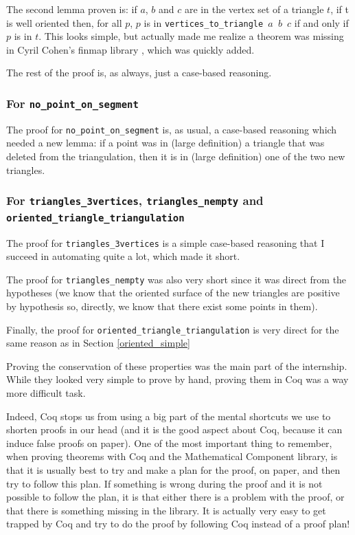 \documentclass[a4paper,10pt]{article}
\begin{document}
The second lemma proven is: if $a$, $b$ and $c$ are in the vertex set of a triangle $t$, if t is well oriented then, for all $p$, $p$ is in {\tt vertices\_to\_triangle $a$ $b$ $c$} if and only if $p$ is in $t$. This looks simple, but actually made me realize a theorem was missing in Cyril Cohen's finmap library \cite{finmap}, which was quickly added.

The rest of the proof is, as always, just a case-based reasoning.

\subsubsection{For {\tt no\_point\_on\_segment}}
The proof for {\tt no\_point\_on\_segment} is, as usual, a case-based reasoning which needed a new lemma: if a point was in (large definition) a triangle that was deleted from the triangulation, then it is in (large definition) one of the two new triangles.

\subsubsection{For {\tt triangles\_3vertices}, {\tt triangles\_nempty} and {\tt oriented\_triangle\_triangulation}}
The proof for {\tt triangles\_3vertices} is a simple case-based reasoning that I succeed in automating quite a lot, which made it short.

The proof for {\tt triangles\_nempty} was also very short since it was direct from the hypotheses (we know that the oriented surface of the new triangles are positive by hypothesis so, directly, we know that there exist some points in them).

Finally, the proof for {\tt oriented\_triangle\_triangulation} is very direct for the same reason as in Section \ref{oriented_simple}

Proving the conservation of these properties was the main part of the internship. While they looked very simple to prove by hand, proving them in {\sc Coq} was a way more difficult task.

Indeed, {\sc Coq} stops us from using a big part of the mental shortcuts we use to shorten proofs in our head (and it is the good aspect about {\sc Coq}, because it can induce false proofs on paper). One of the most important thing to remember, when proving theorems with {\sc Coq} and the {\sc Mathematical Component} library, is that it is usually best to try and make a plan for the proof, on paper, and then try to follow this plan.  If something is wrong during the proof and it is not possible to follow the plan, it is that either there is a problem with the proof, or that there is something missing in the library. It is actually very easy to get trapped by {\sc Coq} and try to do the proof by following {\sc Coq} instead of a proof plan!
\end{document}
